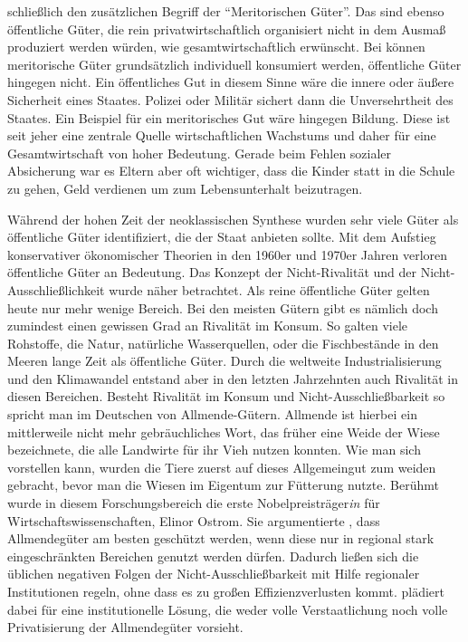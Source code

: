 schließlich den zusätzlichen Begriff der "`Meritorischen Güter"'. Das sind ebenso öffentliche Güter, die rein privatwirtschaftlich organisiert nicht in dem Ausmaß produziert werden würden, wie gesamtwirtschaftlich erwünscht. Bei \textcite{Musgrave1956} können meritorische Güter grundsätzlich individuell konsumiert werden, öffentliche Güter hingegen nicht. Ein öffentliches Gut in diesem Sinne wäre die innere oder äußere Sicherheit eines Staates. Polizei oder Militär sichert dann die Unversehrtheit des Staates. Ein Beispiel für ein meritorisches Gut wäre hingegen Bildung. Diese ist seit jeher eine zentrale Quelle wirtschaftlichen Wachstums und daher für eine Gesamtwirtschaft von hoher Bedeutung. Gerade beim Fehlen sozialer Absicherung war es Eltern aber oft wichtiger, dass die Kinder statt in die Schule zu gehen, Geld verdienen um zum Lebensunterhalt beizutragen. 

Während der hohen Zeit der neoklassischen Synthese wurden sehr viele Güter als öffentliche Güter identifiziert, die der Staat anbieten sollte. Mit dem Aufstieg konservativer ökonomischer Theorien in den 1960er und 1970er Jahren verloren öffentliche Güter an Bedeutung. Das Konzept der Nicht-Rivalität und der Nicht-Ausschließlichkeit wurde näher betrachtet. Als reine öffentliche Güter gelten heute nur mehr wenige Bereich. Bei den meisten Gütern gibt es nämlich doch zumindest einen gewissen Grad an Rivalität im Konsum. So galten viele Rohstoffe, die Natur, natürliche Wasserquellen, oder die Fischbestände in den Meeren lange Zeit als öffentliche Güter. Durch die weltweite Industrialisierung und den Klimawandel entstand aber in den letzten Jahrzehnten auch Rivalität in diesen Bereichen. Besteht Rivalität im Konsum und Nicht-Ausschließbarkeit so spricht man im Deutschen von Allmende-Gütern. Allmende ist hierbei ein mittlerweile nicht mehr gebräuchliches Wort, das früher eine Weide der Wiese bezeichnete, die alle Landwirte für ihr Vieh nutzen konnten. Wie man sich vorstellen kann, wurden die Tiere zuerst auf dieses Allgemeingut zum weiden gebracht, bevor man die Wiesen im Eigentum zur Fütterung nutzte. Berühmt wurde in diesem Forschungsbereich die erste Nobelpreisträger\textit{in} für Wirtschaftswissenschaften, Elinor Ostrom. Sie argumentierte \parencite{Ostrom1990}, dass Allmendegüter am besten geschützt werden, wenn diese nur in regional stark eingeschränkten Bereichen genutzt werden dürfen. Dadurch ließen sich die üblichen negativen Folgen der Nicht-Ausschließbarkeit mit Hilfe regionaler Institutionen regeln, ohne dass es zu großen Effizienzverlusten kommt. \textcite{Ostrom1990} plädiert dabei für eine institutionelle Lösung, die weder volle Verstaatlichung noch volle Privatisierung der Allmendegüter vorsieht.


